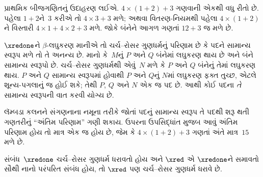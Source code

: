 પ્રાથમિક બીજગણિતનું ઉદાહરણ લઈએ. $4 \times (1+2) + 3$
ગણવાની એકથી વધુ રીતો છે. પહેલા $1+2$ને~$3$ કરીએ તો
$4 \times 3+3$ મળે; અથવા વિતરણ-નિયમથી પહેલા
$4 \times (1+2)$ને વિસ્તારી $4 \times 1+4
\times 2+3$ મળે. જોકે બંનેને આગળ ગણતાં $12+3$ જ
મળે છે.

$\xredone$ને $\beta$-લઘુકરણ માનીએ તો ચર્ચ--રોસર
ગુણધર્મનું પરિણામ છે કે પદને સામાન્ય સ્વરૂપ મળે તો તે
અનન્ય છે. માનો કે~$M$નું $P$ અને $Q$ બંનેમાં લઘુકરણ
થાય છે અને બંને સામાન્ય સ્વરૂપો છે. ચર્ચ--રોસર
ગુણધર્મથી એવું~$N$ મળે કે $P$ અને $Q$ બંનેનું
તેમાં લઘુકરણ થાય. $P$ અને $Q$ સામાન્ય સ્વરૂપમાં
હોવાથી $P$ અને $Q$નું $N$માં લઘુકરણ ફક્ત તુચ્છ,
એટલે શૂન્ય-પગલાનું જ
હોઈ શકે; તેથી $P$, $Q$ અને $N$ એક જ પદ છે. આથી
કોઈ પદના \emph{તે} સામાન્ય સ્વરૂપની વાત કરવી યોગ્ય છે.

લૅમ્બડા કલનને સંગણનાના નમૂના તરીકે જોતાં પદનું સામાન્ય
સ્વરૂપ તે પદથી શરૂ થતી ગણતરીનું ``અંતિમ પરિણામ''
ગણી શકાય. ઉપરના ઉપસિદ્ધાંત મુજબ આવું અંતિમ પરિણામ
હોય તો માત્ર એક જ હોય છે, જેમ કે $4 \times (1+2)+3$
ગણતાં અંતે માત્ર~$15$ મળે છે.

\begin{thm} 
  સંબંધ~$\xredone$ ચર્ચ--રોસર ગુણધર્મ ધરાવતો હોય
  અને $\xred$ એ $\xredone$ને સમાવતો સૌથી નાનો
  પરંપરિત સંબંધ હોય, તો $\xred$ પણ ચર્ચ--રોસર
  ગુણધર્મ ધરાવે છે.
\end{thm}

